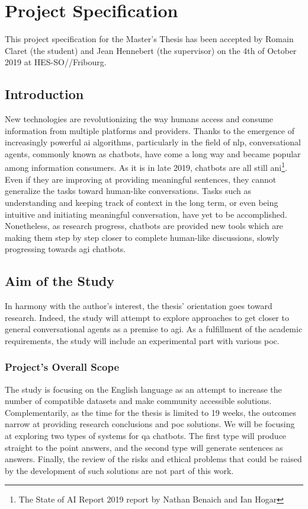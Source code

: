 \chapter*{Project Specification}
This project specification for the Master's Thesis has been accepted by Romain Claret (the student) and Jean Hennebert (the supervisor) on the 4th of October 2019 at HES-SO//Fribourg.

\section*{Introduction}
New technologies are revolutionizing the way humans access and consume information from multiple platforms and providers. Thanks to the emergence of increasingly powerful \gls{ai} algorithms, particularly in the field of \gls{nlp}, conversational agents, commonly known as chatbots, have come a long way and became popular among information consumers. As it is in late 2019, chatbots are all still \gls{ani}\footnote{The State of AI Report 2019 report by Nathan Benaich and Ian Hogar\cite{studies:state_of_ai_2019}}. Even if they are improving at providing meaningful sentences, they cannot generalize the tasks toward human-like conversations. Tasks such as understanding and keeping track of context in the long term, or even being intuitive and initiating meaningful conversation, have yet to be accomplished. Nonetheless, as research progress, chatbots are provided new tools which are making them step by step closer to complete human-like discussions, slowly progressing towards \gls{agi} chatbots.


\section*{Aim of the Study}
In harmony with the author's interest, the thesis' orientation goes toward research. Indeed, the study will attempt to explore approaches to get closer to general conversational agents as a premise to \gls{agi}. As a fulfillment of the academic requirements, the study will include an experimental part with various \gls{poc}.

\subsection*{Project's Overall Scope}
The study is focusing on the English language as an attempt to increase the number of compatible datasets and make community accessible solutions. Complementarily, as the time for the thesis is limited to 19 weeks, the outcomes narrow at providing research conclusions and \gls{poc} solutions. We will be focusing at exploring two types of systems for \gls{qa} chatbots. The first type will produce straight to the point answers, and the second type will generate sentences as answers. Finally, the review of the risks and ethical problems that could be raised by the development of such solutions are not part of this work.


